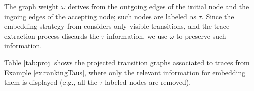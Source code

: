 \begin{table}[!t]
	\caption{Projections of $\expN$ over $\net$-traces of length $4$.}\label{tab:proj}
	\centering
	\qquad \qquad 	
\vspace{-0.2cm}
\end{table}
The graph weight $\omega$ derives from the outgoing edges of the initial node and the ingoing edges of the accepting node; 
such nodes are labeled as $\tau$. Since the embedding strategy from \cite{LodhiSSCW02} considers only visible 
transitions, and the trace extraction process discards the $\tau$ information, we use $\omega$ to preserve such information.
\begin{example}\label{ex:neue}
Table \ref{tab:proj} shows the projected transition graphs associated to  traces from Example \ref{ex:rankingTaus}, where only the relevant information
for embedding them is displayed (e.g., all the $\tau$-labeled nodes are removed).
\end{example}
	
